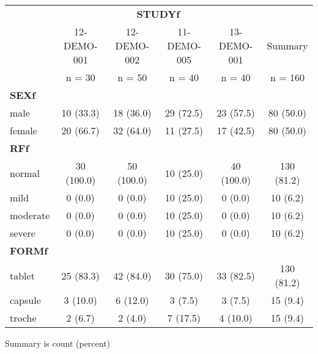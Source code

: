 {\def\arraystretch{1.4}\tabcolsep=5pt
\begin{threeparttable}
\begin{tabular}[h]{lccccc}
\hline
\multicolumn{1}{c}{} & \multicolumn{4}{c}{\textbf{STUDYf}} & \multicolumn{1}{c}{}\\
\cmidrule(lr){2-5}
 & 12-DEMO-001 & 12-DEMO-002 & 11-DEMO-005 & 13-DEMO-001 & Summary \\ [-0.56em]
 & n = 30 & n = 50 & n = 40 & n = 40 & n = 160 \\
\hline
\multicolumn{6}{l}{\textbf{SEXf}}\\
male & 10 (33.3) & 18 (36.0) & 29 (72.5) & 23 (57.5) & 80 (50.0) \\
female & 20 (66.7) & 32 (64.0) & 11 (27.5) & 17 (42.5) & 80 (50.0) \\
\hline \multicolumn{6}{l}{\textbf{RFf}}\\
normal & 30 (100.0) & 50 (100.0) & 10 (25.0) & 40 (100.0) & 130 (81.2) \\
mild & 0 (0.0) & 0 (0.0) & 10 (25.0) & 0 (0.0) & 10 (6.2) \\
moderate & 0 (0.0) & 0 (0.0) & 10 (25.0) & 0 (0.0) & 10 (6.2) \\
severe & 0 (0.0) & 0 (0.0) & 10 (25.0) & 0 (0.0) & 10 (6.2) \\
\hline \multicolumn{6}{l}{\textbf{FORMf}}\\
tablet & 25 (83.3) & 42 (84.0) & 30 (75.0) & 33 (82.5) & 130 (81.2) \\
capsule & 3 (10.0) & 6 (12.0) & 3 (7.5) & 3 (7.5) & 15 (9.4) \\
troche & 2 (6.7) & 2 (4.0) & 7 (17.5) & 4 (10.0) & 15 (9.4) \\
\hline
\end{tabular}
\begin{tablenotes}[flushleft]
\item Summary is count (percent)
\end{tablenotes}
\end{threeparttable}
}
